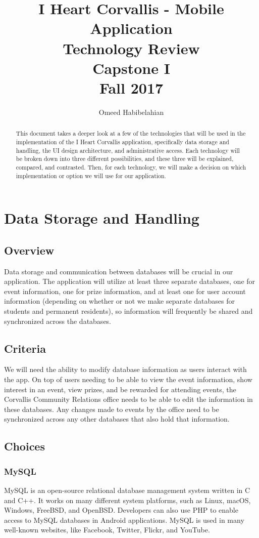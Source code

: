 \documentclass[draftclsnofoot, onecolumn, 10pt, compsoc]{IEEEtran}
\title{\textbf{I Heart Corvallis - Mobile Application\\Technology Review}\\Capstone I\\Fall 2017}
\author{Omeed Habibelahian}
\begin{document}
	\maketitle
	\begin{abstract}
		This document takes a deeper look at a few of the technologies that will be used in the implementation of the I Heart Corvallis application, specifically data storage and handling, the UI design architecture, and administrative access. Each technology will be broken down into three different possibilities, and these three will be explained, compared, and contrasted. Then, for each technology, we will make a decision on which implementation or option we will use for our application.
	\end{abstract}
	\newpage
	
	\tableofcontents
	\newpage
	
	\section{Data Storage and Handling}
		\subsection{Overview}
			Data storage and communication between databases will be crucial in our application. The application will utilize at least three separate databases, one for event information, one for prize information, and at least one for user account information (depending on whether or not we make separate databases for students and permanent residents), so information will frequently be shared and synchronized across the databases.
		\subsection{Criteria}
			We will need the ability to modify database information as users interact with the app. On top of users needing to be able to view the event information, show interest in an event, view prizes, and be rewarded for attending events, the Corvallis Community Relations office needs to be able to edit the information in these databases. Any changes made to events by the office need to be synchronized across any other databases that also hold that information.
		
		\subsection{Choices}
			\subsubsection{\textbf{MySQL}}
				MySQL is an open-source relational database management system written in C and C++. It works on many different system platforms, such as Linux, macOS, Windows, FreeBSD, and OpenBSD. Developers can also use PHP to enable access to MySQL databases in Android applications. MySQL is used in many well-known websites, like Facebook, Twitter, Flickr, and YouTube.
				~\cite{wiki:MySQL}
				~\cite{MySQL_Android}			
\end{document}
